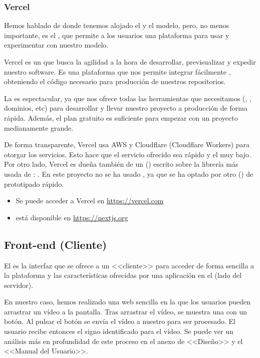 \subsubsection{Vercel}

Hemos hablado de donde tenemos alojado el  y el modelo, pero, no menos importante, es el , que permite a los usuarios una plataforma para usar y experimentar con nuestro modelo.

Vercel es un  que busca la agilidad a la hora de desarrollar, previsualizar y expedir nuestro software. Es una plataforma que nos permite integrar fácilmente , obteniendo el código necesario para producción de nuestros repositorios.

La  es espectacular, ya que nos ofrece todas las herramientas que necesitamos (, , dominios, etc) para desarrollar y llevar nuestro proyecto a producción de forma rápida. Además, el plan gratuito es suficiente para empezar con un proyecto medianamente grande.

De forma transparente, Vercel usa AWS y Cloudflare (Cloudflare Workers) para otorgar los servicios. Esto hace que el servicio ofrecido sea rápido y el  muy bajo. Por otro lado, Vercel es dueña también de un  () escrito sobre la librería más usada de : . En este proyecto no se ha usado , ya que se ha optado por otro  () de prototipado rápido.

\begin{itemize}
  \item Se puede acceder a Vercel en \url{https://vercel.com}
  \item {} está disponible en \url{https://nextjs.org}
\end{itemize}

\subsection{Front-end (Cliente)}

El  es la interfaz que se ofrece a un <<cliente>> para acceder de forma sencilla a la plataforma y las características ofrecidas por una aplicación en el  (lado del servidor).

En nuestro caso, hemos realizado una web sencilla en la que los usuarios pueden arrastrar un vídeo a la pantalla. Tras arrastrar el vídeo, se muestra una  con un botón. Al pulsar el botón se envía
el vídeo a nuestro  para ser procesado. El usuario recibe entonces el signo identificado para el vídeo. Se puede ver un análisis más en profundidad de este proceso en el anexo de <<Diseño>> y el <<Manual del Usuario>>.

